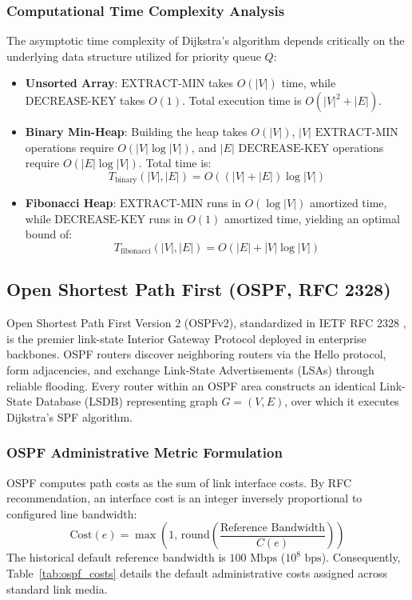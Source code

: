 \subsubsection{Computational Time Complexity Analysis}
The asymptotic time complexity of Dijkstra's algorithm depends critically on the underlying data structure utilized for priority queue $Q$:
\begin{itemize}
    \item \textbf{Unsorted Array}: $\text{EXTRACT-MIN}$ takes $O(|V|)$ time, while $\text{DECREASE-KEY}$ takes $O(1)$. Total execution time is $O(|V|^2 + |E|)$.
    \item \textbf{Binary Min-Heap}: Building the heap takes $O(|V|)$, $|V|$ $\text{EXTRACT-MIN}$ operations require $O(|V| \log |V|)$, and $|E|$ $\text{DECREASE-KEY}$ operations require $O(|E| \log |V|)$. Total time is:
    \begin{equation}
        T_{\text{binary}}(|V|, |E|) = O((|V| + |E|) \log |V|)
    \end{equation}
    \item \textbf{Fibonacci Heap}: $\text{EXTRACT-MIN}$ runs in $O(\log |V|)$ amortized time, while $\text{DECREASE-KEY}$ runs in $O(1)$ amortized time, yielding an optimal bound of:
    \begin{equation}
        T_{\text{fibonacci}}(|V|, |E|) = O(|E| + |V| \log |V|)
    \end{equation}
\end{itemize}

\subsection{Open Shortest Path First (OSPF, RFC 2328)}
Open Shortest Path First Version 2 (OSPFv2), standardized in IETF RFC 2328 \cite{moy1998ospf}, is the premier link-state Interior Gateway Protocol deployed in enterprise backbones. OSPF routers discover neighboring routers via the Hello protocol, form adjacencies, and exchange Link-State Advertisements (LSAs) through reliable flooding. Every router within an OSPF area constructs an identical Link-State Database (LSDB) representing graph $G = (V, E)$, over which it executes Dijkstra's SPF algorithm.

\subsubsection{OSPF Administrative Metric Formulation}
OSPF computes path costs as the sum of link interface costs. By RFC recommendation, an interface cost is an integer inversely proportional to configured line bandwidth:
\begin{equation}
    \text{Cost}(e) = \max\left(1, \, \text{round}\left( \frac{\text{Reference Bandwidth}}{C(e)} \right)\right)
    \label{eq:ospf_cost_formula}
\end{equation}
The historical default reference bandwidth is $100\text{ Mbps}$ ($10^8\text{ bps}$). Consequently, Table~\ref{tab:ospf_costs} details the default administrative costs assigned across standard link media.

